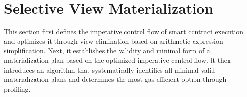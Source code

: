 \section{Selective View Materialization}
\label{sec-materialization}

This section first defines the imperative control flow of smart contract execution and optimizes it through view elimination based on
arithmetic expression simplification.
Next, it establishes the validity and minimal form of a materialization plan 
based on the optimized imperative control flow. 
It then introduces an algorithm that systematically identifies 
all minimal valid materialization plans and determines the most gas-efficient option through profiling.





